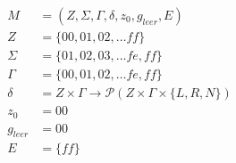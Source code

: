 \documentclass[preview]{standalone}
\begin{document}
\begin{align}
M &= ( Z, \Sigma, \Gamma, \delta, z_{0}, g_{leer}, E )\\
Z &= \{ 00, 01, 02, \dots ff \}\\
\Sigma &= \{ 01, 02, 03, \dots fe, ff \}\\
\Gamma &= \{ 00, 01, 02, \dots fe, ff \}\\
\delta &= Z\times\Gamma\rightarrow\mathcal{P}(Z\times\Gamma\times\{L,R,N\})\\
z_{0} &= 00\\
g_{leer} &= 00\\
E &= \{ ff \}
\end{align}
\end{document}
